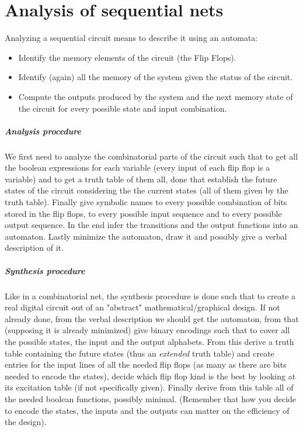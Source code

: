 \documentclass{scrartcl}
\begin{document}
    \section{Analysis of sequential nets} Analyzing a sequential circuit means to describe it using an automata:
    \begin{itemize}
        \item Identify the memory elements of the circuit (the Flip Flops).
        \item Identify (again) all the memory of the system given the status of the circuit.
        \item Compute the outputs produced by the system and the next memory state of the circuit for every possible state and input combination.
    \end{itemize}
    \subparagraph{Analysis procedure} We first need to analyze the combinatorial parts of the circuit such that to get all the boolean expressions for each variable (every input of each flip flop is a variable) and to get a truth table of them all, done that establish the future states of the circuit considering the the current states (all of them given by the truth table). Finally give symbolic names to every possible combination of bits stored in the flip flops, to every possible input sequence and to every possible output sequence. In the end infer the transitions and the output functions into an automaton. Lastly minimize the automaton, draw it and possibly give a verbal description of it.
    \subparagraph{Synthesis procedure} Like in a combinatorial net, the synthesis procedure is done such that to create a real digital circuit out of an "abstract" mathematical/graphical design. If not already done, from the verbal description we should get the automaton, from that (supposing it is already minimized) give binary encodings such that to cover all the possible states, the input and the output alphabets. From this derive a truth table containing the future states (thus an \emph{extended} truth table) and create entries for the input lines of all the needed flip flops (as many as there are bits needed to encode the states), decide which flip flop kind is the best by looking at its excitation table (if not specifically given). Finally derive from this table all of the needed boolean functions, possibly minimal. (Remember that how you decide to encode the states, the inputs and the outputs can matter on the efficiency of the design).
\end{document}
